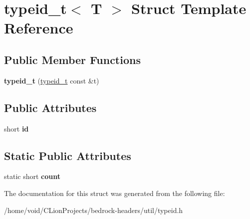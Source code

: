 \hypertarget{structtypeid__t}{}\section{typeid\+\_\+t$<$ T $>$ Struct Template Reference}
\label{structtypeid__t}
\subsection*{Public Member Functions}
\begin{DoxyCompactItemize}
\item 
\mbox{\label{structtypeid__t_a6a244901ca83b692eea0c63a93d08211}} 
{\bfseries typeid\+\_\+t} (\mbox{\hyperlink{structtypeid__t}{typeid\+\_\+t}} const \&t)
\end{DoxyCompactItemize}
\subsection*{Public Attributes}
\begin{DoxyCompactItemize}
\item 
\mbox{\label{structtypeid__t_a8e3ae1a01907d4fcffac441e6af30814}} 
short {\bfseries id}
\end{DoxyCompactItemize}
\subsection*{Static Public Attributes}
\begin{DoxyCompactItemize}
\item 
\mbox{\label{structtypeid__t_aba9ddfc90c8d5f20ef78da375160cff3}} 
static short {\bfseries count}
\end{DoxyCompactItemize}


The documentation for this struct was generated from the following file\+:\begin{DoxyCompactItemize}
\item 
/home/void/\+C\+Lion\+Projects/bedrock-\/headers/util/typeid.\+h\end{DoxyCompactItemize}
